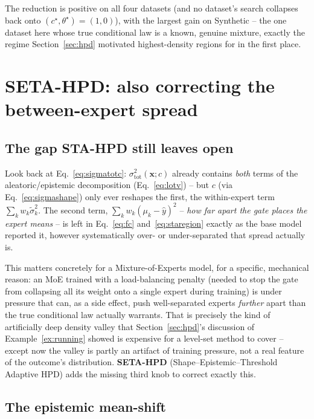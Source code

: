 \documentclass[11pt]{article}
\begin{document}
The reduction is positive on all four datasets (and no dataset's search collapses back onto
$(c^\star,\theta^\star)=(1,0)$), with the largest gain on Synthetic -- the one dataset here whose
true conditional law is a known, genuine mixture, exactly the regime Section~\ref{sec:hpd}
motivated highest-density regions for in the first place.

\section{SETA-HPD: also correcting the between-expert spread}
\label{sec:seta}

\subsection{The gap STA-HPD still leaves open}

Look back at Eq.~\eqref{eq:sigmatotc}: $\sigma_{\mathrm{tot}}^2(\bm x;c)$ already contains
\emph{both} terms of the aleatoric/epistemic decomposition (Eq.~\ref{eq:lotv}) -- but $c$ (via
Eq.~\ref{eq:sigmashape}) only ever reshapes the first, the within-expert term $\sum_k
w_k\tilde\sigma_k^2$. The second term, $\sum_k w_k(\mu_k-\hat y)^2$ -- \emph{how far apart the gate
places the expert means} -- is left in Eq.~\eqref{eq:fc} and~\eqref{eq:staregion} exactly as the
base model reported it, however systematically over- or under-separated that spread actually is.

This matters concretely for a Mixture-of-Experts model, for a specific, mechanical reason: an MoE
trained with a load-balancing penalty (needed to stop the gate from collapsing all its weight
onto a single expert during training) is under pressure that can, as a side effect, push
well-separated experts \emph{further} apart than the true conditional law actually warrants. That
is precisely the kind of artificially deep density valley that Section~\ref{sec:hpd}'s discussion
of Example~\ref{ex:running} showed is expensive for a level-set method to cover -- except now the
valley is partly an artifact of training pressure, not a real feature of the outcome's
distribution. \textbf{SETA-HPD} (Shape--Epistemic--Threshold Adaptive HPD) adds the missing third
knob to correct exactly this.

\subsection{The epistemic mean-shift}
\end{document}
